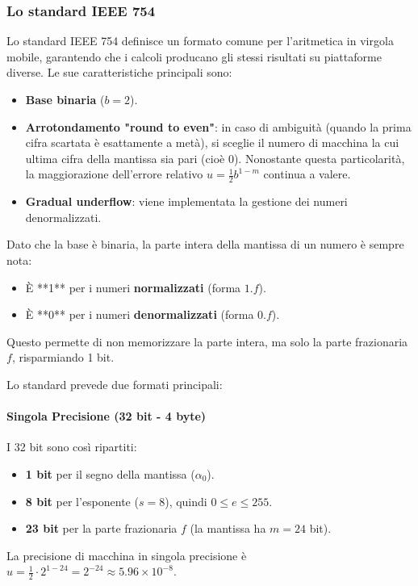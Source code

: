 \subsubsection{Lo standard IEEE 754}
Lo standard IEEE 754 definisce un formato comune per l'aritmetica in virgola mobile, garantendo che i calcoli producano gli stessi risultati su piattaforme diverse.
Le sue caratteristiche principali sono:
\begin{itemize}
    \item \textbf{Base binaria} ($b=2$).
    \item \textbf{Arrotondamento "round to even"}: in caso di ambiguità (quando la prima cifra scartata è esattamente a metà), si sceglie il numero di macchina la cui ultima cifra della mantissa sia pari (cioè 0). Nonostante questa particolarità, la maggiorazione dell'errore relativo $u = \frac{1}{2}b^{1-m}$ continua a valere.
    \item \textbf{Gradual underflow}: viene implementata la gestione dei numeri denormalizzati.
\end{itemize}
Dato che la base è binaria, la parte intera della mantissa di un numero è sempre nota:
\begin{itemize}
    \item È **1** per i numeri \textbf{normalizzati} (forma $1.f$).
    \item È **0** per i numeri \textbf{denormalizzati} (forma $0.f$).
\end{itemize}
Questo permette di non memorizzare la parte intera, ma solo la parte frazionaria $f$, risparmiando 1 bit.

Lo standard prevede due formati principali:

\paragraph{Singola Precisione (32 bit - 4 byte)}
I 32 bit sono così ripartiti:
\begin{itemize}
    \item \textbf{1 bit} per il segno della mantissa ($\alpha_0$).
    \item \textbf{8 bit} per l'esponente ($s=8$), quindi $0 \le e \le 255$.
    \item \textbf{23 bit} per la parte frazionaria $f$ (la mantissa ha $m=24$ bit).
\end{itemize}
La precisione di macchina in singola precisione è $u = \frac{1}{2} \cdot 2^{1-24} = 2^{-24} \approx 5.96 \times 10^{-8}$.

